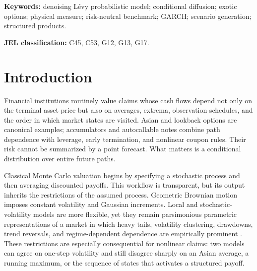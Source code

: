 ﻿\documentclass[12pt,letterpaper]{article}
\begin{document}
\begin{titlepage}
\begin{abstract}
We then use the learned physical-measure distribution in a transparent P--Q
payoff diagnostic. The Q side is an independently fitted Student-$t$
GARCH(1,1) benchmark with capped, unit-variance innovations and a numerical
log-mgf correction that enforces the stated discrete martingale restriction.
At the pre-specified $g=0.05$ dealer-spread setting and a $1\%S_0$ materiality
threshold, the aligned, unconditional P--Q diagnostic is 0.91\% of initial
spot for vanilla calls and 0.36\% for Asian calls. Complementary drift-neutral
and initial-delta diagnostics decompose this payoff difference into
direction-sensitive and residual components. Physical direction is an
important component of the raw gap; under the one-time RN-Q Delta diagnostic,
the Vanilla residual is 0.33\% of spot while the Asian residual is close to
zero. The P--Q framework is a belief-based payoff diagnostic, distinct from
an option-surface-calibrated pricing engine.
\end{abstract}

\enlargethispage{4\baselineskip}
\medskip
\noindent\textbf{Keywords:} denoising L\'evy probabilistic model; conditional diffusion;
exotic options; physical measure; risk-neutral benchmark; GARCH; scenario
generation; structured products.

\medskip
\noindent\textbf{JEL classification:} C45, C53, G12, G13, G17.
\end{titlepage}

\clearpage
{}
\doublespacing

\section{Introduction}\label{sec:introduction}
Financial institutions routinely value claims whose cash flows depend not
only on the terminal asset price but also on averages, extrema, observation
schedules, and the order in which market states are visited. Asian and
lookback options are canonical examples; accumulators and autocallable notes
combine path dependence with leverage, early termination, and nonlinear
coupon rules. Their risk cannot be summarized by a point forecast. What
matters is a conditional distribution over entire future paths.

Classical Monte Carlo valuation begins by specifying a stochastic process and
then averaging discounted payoffs. This workflow is transparent, but its
output inherits the restrictions of the assumed process. Geometric Brownian
motion imposes constant volatility and Gaussian increments. Local and
stochastic-volatility models are more flexible, yet they remain parsimonious
parametric representations of a market in which heavy tails, volatility
clustering, drawdowns, trend reversals, and regime-dependent dependence are
empirically prominent \citep{cont2001empirical}. These restrictions are
especially consequential for nonlinear claims: two models can agree on
one-step volatility and still disagree sharply on an Asian average, a running
maximum, or the sequence of states that activates a structured payoff.
\end{document}
